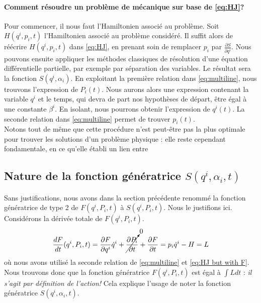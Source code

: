 \documentclass[11pt,oneside,a4paper]{article}
\newcommand{\dif}[2]{\frac{\partial #1}{\partial #2}}
\newcommand{\ddif}[2]{\frac{d#1}{d#2}}
\begin{document}
    \paragraph*{Comment résoudre un problème de mécanique sur base de \eqref{eq:HJ}?}\label{sec:kezako}

    Pour commencer, il nous faut l'Hamiltonien associé au problème. Soit $H(q^i,p_i,t)$ l'Hamiltonien associé au problème considéré. Il suffit alors de réécrire $H(q^i,p_i,t)$ dans \eqref{eq:HJ}, en prenant soin de remplacer $p_i$ par $\dif{S}{q^i}$. Nous pouvons ensuite appliquer les méthodes classiques de résolution d'une équation différentielle partielle, par exemple par séparation des variables. Le résultat sera la fonction $S(q^i,\alpha_i)$. En exploitant la première relation dans \eqref{eq:multiline}, nous trouvons l'expression de $P_i(t)$. Nous aurons alors une expression contenant la variable $q^i$ et le temps, qui devra de part nos hypothèses de départ, être égal à une constante $\beta^i$. En isolant, nous pourrons obtenir l'expression de $q^i(t)$. La seconde relation dans \eqref{eq:multiline} permet de trouver $p_i(t)$.\\

    Notons tout de même que cette procédure n'est peut-être pas la plus optimale pour trouver les solutions d'un problème physique : elle reste cependant fondamentale, en ce qu'elle établi un lien entre 

    \subsection{Nature de la fonction génératrice $S(q^i,\alpha_i,t)$}

    Sans justifications, nous avons dans la section précédente renommé la fonction génératrice de type 2 de $F(q^i,P_i,t)$ à $S(q^i,P_i,t)$. Nous le justifions ici. Considérons la dérivée totale de $F(q^i,P_i,t)$.
    \begin{align}
      \ddif{F}{t}(q^i,P_i,t) = \dif{F}{q^i}\dot{q}^i+\cancelto{0}{\dif{P_i}{t}}+\dif{F}{t} = p_i\dot{q}^i - H = L
    \end{align}
    où nous avons utilisé la seconde relation de \eqref{eq:multiline} et \eqref{eq:HJ but with F}.\\

    Nous trouvons donc que la fonction génératrice $F(q^i,P_i,t)$ est égal à $\int Ldt$ : \emph{il s'agit par définition de l'action!} Cela explique l'usage de noter la fonction génératrice $S(q^i,\alpha_i,t)$.
\end{document}
